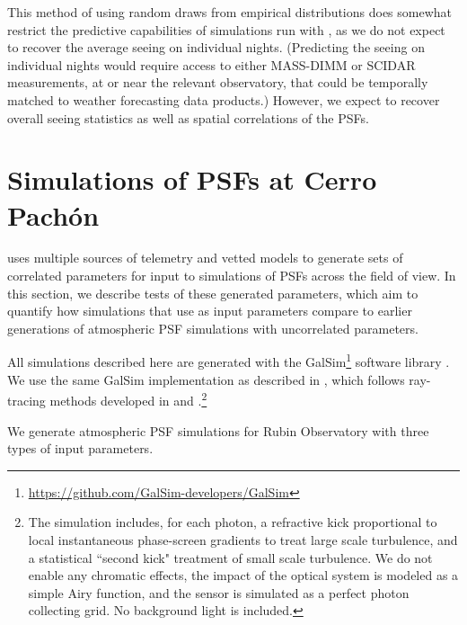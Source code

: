 \documentclass[twocolumn,twocolappendix]{openjournal}
\begin{document}
This method of using random draws from empirical distributions does somewhat restrict the predictive capabilities of simulations run with \psfws, as we do not expect to recover the average seeing on individual nights.
(Predicting the seeing on individual nights would require access to either MASS-DIMM or SCIDAR measurements, at or near the relevant observatory, that could be temporally matched to weather forecasting data products.)
However, we expect to recover overall seeing statistics as well as spatial correlations of the PSFs.  


\section{Simulations of PSFs at Cerro Pach\'on}\label{sec:imsiminputs}
\psfws uses multiple sources of telemetry and vetted models to generate sets of correlated parameters for input to simulations of PSFs across the field of view.
In this section, we describe tests of these generated parameters, which aim to quantify how simulations that use as input \psfws parameters compare to earlier generations of atmospheric PSF simulations with uncorrelated parameters. 

All simulations described here are generated with the GalSim\footnote{\url{https://github.com/GalSim-developers/GalSim}} software library \citep{rowe_galsim_2015}.
We use the same GalSim implementation as described in \dcii, which follows ray-tracing methods developed in \cite{jee_toward_2011} and \cite{peterson_simulation_2015}.\footnote{The simulation includes, for each photon, a refractive kick proportional to local instantaneous phase-screen gradients to treat large scale turbulence, and a statistical ``second kick" treatment of small scale turbulence.  We do not enable any chromatic effects, the impact of the optical system is modeled as a simple Airy function, and the sensor is simulated as a perfect photon collecting grid.  No background light is included.}

We generate atmospheric PSF simulations for Rubin Observatory with three types of input parameters.
\end{document}
